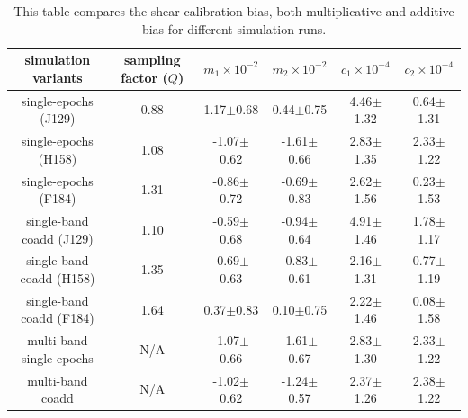 \documentclass[fleqn,usenatbib]{mnras}
\begin{document}
\begin{table}
	\centering
	\begin{tabular}[width=\textwidth]{ c|c|c|c|c|c } 
		\hline
		simulation variants & sampling factor ($Q$) & $m_{1}\times10^{-2}$ & $m_{2}\times10^{-2}$ & $c_{1}\times10^{-4}$ & $c_{2}\times10^{-4}$\\
		\hline
		single-epochs (J129) & 0.88 & 1.17$\pm$0.68 & 0.44$\pm$0.75 & 4.46$\pm$1.32 & 0.64$\pm$1.31\\
		single-epochs (H158) & 1.08 & -1.07$\pm$0.62 & -1.61$\pm$0.66 & 2.83$\pm$1.35 & 2.33$\pm$1.22\\
		single-epochs (F184) & 1.31 & -0.86$\pm$0.72 & -0.69$\pm$0.83 & 2.62$\pm$1.56 & 0.23$\pm$1.53\\
		\hline
		single-band coadd (J129) & 1.10 & -0.59$\pm$0.68 & -0.94$\pm$0.64 & 4.91$\pm$1.46 & 1.78$\pm$1.17\\
		single-band coadd (H158) & 1.35 & -0.69$\pm$0.63 & -0.83$\pm$0.61 & 2.16$\pm$1.31 & 0.77$\pm$1.19\\
		single-band coadd (F184) & 1.64 & 0.37$\pm$0.83 & 0.10$\pm$0.75 & 2.22$\pm$1.46 & 0.08$\pm$1.58\\
		\hline
		multi-band single-epochs & N/A & -1.07$\pm$0.66 & -1.61$\pm$0.67 & 2.83$\pm$1.30 & 2.33$\pm$1.22 \\
		multi-band coadd & N/A & -1.02$\pm$0.62 & -1.24$\pm$0.57 & 2.37$\pm$1.26 & 2.38$\pm$1.22\\
		
		\hline
	\end{tabular}
	\caption{This table compares the shear calibration bias, both multiplicative and additive bias for different simulation runs.}
	\label{tab:bias_summary}
\end{table}
\end{document}
